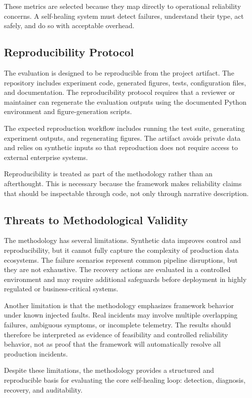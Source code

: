 These metrics are selected because they map directly to operational reliability concerns. A self-healing system must detect failures, understand their type, act safely, and do so with acceptable overhead.

\subsection{Reproducibility Protocol}

The evaluation is designed to be reproducible from the project artifact. The repository includes experiment code, generated figures, tests, configuration files, and documentation. The reproducibility protocol requires that a reviewer or maintainer can regenerate the evaluation outputs using the documented Python environment and figure-generation scripts.

The expected reproduction workflow includes running the test suite, generating experiment outputs, and regenerating figures. The artifact avoids private data and relies on synthetic inputs so that reproduction does not require access to external enterprise systems.

Reproducibility is treated as part of the methodology rather than an afterthought. This is necessary because the framework makes reliability claims that should be inspectable through code, not only through narrative description.

\subsection{Threats to Methodological Validity}

The methodology has several limitations. Synthetic data improves control and reproducibility, but it cannot fully capture the complexity of production data ecosystems. The failure scenarios represent common pipeline disruptions, but they are not exhaustive. The recovery actions are evaluated in a controlled environment and may require additional safeguards before deployment in highly regulated or business-critical systems.

Another limitation is that the methodology emphasizes framework behavior under known injected faults. Real incidents may involve multiple overlapping failures, ambiguous symptoms, or incomplete telemetry. The results should therefore be interpreted as evidence of feasibility and controlled reliability behavior, not as proof that the framework will automatically resolve all production incidents.

Despite these limitations, the methodology provides a structured and reproducible basis for evaluating the core self-healing loop: detection, diagnosis, recovery, and auditability.


